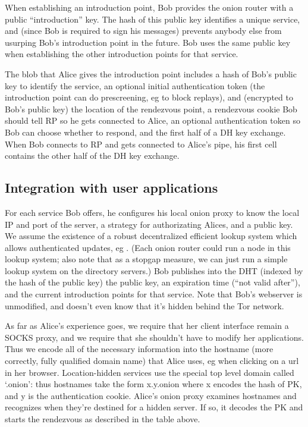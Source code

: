 \documentclass[times,10pt,twocolumn]{article}
\begin{document}
When establishing an introduction point, Bob provides the onion router
with a public ``introduction'' key.  The hash of this public key
identifies a unique service, and (since Bob is required to sign his
messages) prevents anybody else from usurping Bob's introduction point
in the future. Bob uses the same public key when establishing the other
introduction points for that service.

The blob that Alice gives the introduction point includes a hash of Bob's
public key to identify the service, an optional initial authentication
token (the introduction point can do prescreening, eg to block replays),
and (encrypted to Bob's public key) the location of the rendezvous point,
a rendezvous cookie Bob should tell RP so he gets connected to
Alice, an optional authentication token so Bob can choose whether to respond,
and the first half of a DH key exchange. When Bob connects to RP
and gets connected to Alice's pipe, his first cell contains the
other half of the DH key exchange.


\subsection{Integration with user applications}

For each service Bob offers, he configures his local onion proxy to know
the local IP and port of the server, a strategy for authorizating Alices,
and a public key. We assume the existence of a robust decentralized
efficient lookup system which allows authenticated updates, eg
\cite{cfs:sosp01}. (Each onion router could run a node in this lookup
system; also note that as a stopgap measure, we can just run a simple
lookup system on the directory servers.)  Bob publishes into the DHT
(indexed by the hash of the public key) the public key, an expiration
time (``not valid after''), and the current introduction points for that
service. Note that Bob's webserver is unmodified, and doesn't even know
that it's hidden behind the Tor network.

As far as Alice's experience goes, we require that her client interface
remain a SOCKS proxy, and we require that she shouldn't have to modify
her applications. Thus we encode all of the necessary information into
the hostname (more correctly, fully qualified domain name) that Alice
uses, eg when clicking on a url in her browser. Location-hidden services
use the special top level domain called `.onion': thus hostnames take the
form x.y.onion where x encodes the hash of PK, and y is the authentication
cookie. Alice's onion proxy examines hostnames and recognizes when they're
destined for a hidden server. If so, it decodes the PK and starts the
rendezvous as described in the table above.
\end{document}
